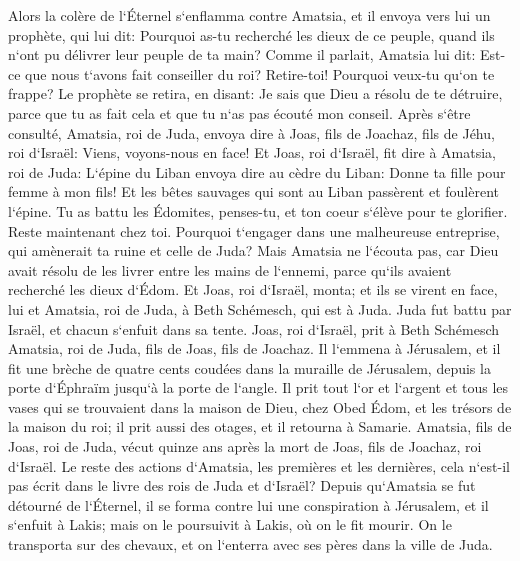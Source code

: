 \verse Alors la colère de l`Éternel s`enflamma contre Amatsia, et il envoya vers lui un prophète, qui lui dit: Pourquoi as-tu recherché les dieux de ce peuple, quand ils n`ont pu délivrer leur peuple de ta main? 
\verse Comme il parlait, Amatsia lui dit: Est-ce que nous t`avons fait conseiller du roi? Retire-toi! Pourquoi veux-tu qu`on te frappe? Le prophète se retira, en disant: Je sais que Dieu a résolu de te détruire, parce que tu as fait cela et que tu n`as pas écouté mon conseil. 
\verse Après s`être consulté, Amatsia, roi de Juda, envoya dire à Joas, fils de Joachaz, fils de Jéhu, roi d`Israël: Viens, voyons-nous en face! 
\verse Et Joas, roi d`Israël, fit dire à Amatsia, roi de Juda: L`épine du Liban envoya dire au cèdre du Liban: Donne ta fille pour femme à mon fils! Et les bêtes sauvages qui sont au Liban passèrent et foulèrent l`épine. 
\verse Tu as battu les Édomites, penses-tu, et ton coeur s`élève pour te glorifier. Reste maintenant chez toi. Pourquoi t`engager dans une malheureuse entreprise, qui amènerait ta ruine et celle de Juda? 
\verse Mais Amatsia ne l`écouta pas, car Dieu avait résolu de les livrer entre les mains de l`ennemi, parce qu`ils avaient recherché les dieux d`Édom. 
\verse Et Joas, roi d`Israël, monta; et ils se virent en face, lui et Amatsia, roi de Juda, à Beth Schémesch, qui est à Juda. 
\verse Juda fut battu par Israël, et chacun s`enfuit dans sa tente. 
\verse Joas, roi d`Israël, prit à Beth Schémesch Amatsia, roi de Juda, fils de Joas, fils de Joachaz. Il l`emmena à Jérusalem, et il fit une brèche de quatre cents coudées dans la muraille de Jérusalem, depuis la porte d`Éphraïm jusqu`à la porte de l`angle. 
\verse Il prit tout l`or et l`argent et tous les vases qui se trouvaient dans la maison de Dieu, chez Obed Édom, et les trésors de la maison du roi; il prit aussi des otages, et il retourna à Samarie. 
\verse Amatsia, fils de Joas, roi de Juda, vécut quinze ans après la mort de Joas, fils de Joachaz, roi d`Israël. 
\verse Le reste des actions d`Amatsia, les premières et les dernières, cela n`est-il pas écrit dans le livre des rois de Juda et d`Israël? 
\verse Depuis qu`Amatsia se fut détourné de l`Éternel, il se forma contre lui une conspiration à Jérusalem, et il s`enfuit à Lakis; mais on le poursuivit à Lakis, où on le fit mourir. 
\verse On le transporta sur des chevaux, et on l`enterra avec ses pères dans la ville de Juda. 

\chapter{}

